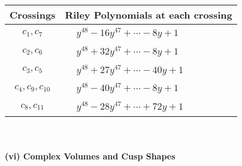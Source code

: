 \documentclass[1p]{elsarticle_modified}
\theoremstyle{definition}
\begin{document}
\begin{tabular}{m{50pt}|m{274pt}}
Crossings & \hspace{64pt}Riley Polynomials at each crossing \\
\hline $$\begin{aligned}c_{1},c_{7}\end{aligned}$$&$\begin{aligned}
&y^{48}-16 y^{47}+\cdots-8 y+1
\end{aligned}$\\
\hline $$\begin{aligned}c_{2},c_{6}\end{aligned}$$&$\begin{aligned}
&y^{48}+32 y^{47}+\cdots-8 y+1
\end{aligned}$\\
\hline $$\begin{aligned}c_{3},c_{5}\end{aligned}$$&$\begin{aligned}
&y^{48}+27 y^{47}+\cdots-40 y+1
\end{aligned}$\\
\hline $$\begin{aligned}c_{4},c_{9},c_{10}\end{aligned}$$&$\begin{aligned}
&y^{48}-40 y^{47}+\cdots-8 y+1
\end{aligned}$\\
\hline $$\begin{aligned}c_{8},c_{11}\end{aligned}$$&$\begin{aligned}
&y^{48}-28 y^{47}+\cdots+72 y+1
\end{aligned}$\\
\hline
\end{tabular}\\~\\
\newpage\flushleft \textbf{(vi) Complex Volumes and Cusp Shapes}
\end{document}
